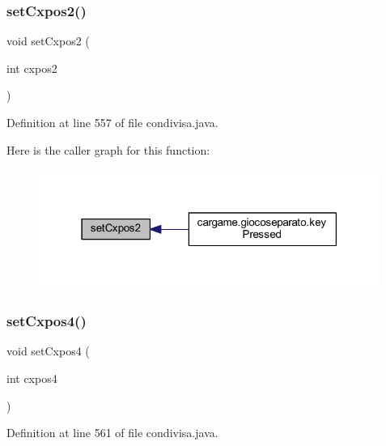 \subsubsection{\texorpdfstring{set\+Cxpos2()}{setCxpos2()}}
{\footnotesize\ttfamily void set\+Cxpos2 (\begin{DoxyParamCaption}\item[{int}]{cxpos2 }\end{DoxyParamCaption})}



Definition at line 557 of file condivisa.\+java.

Here is the caller graph for this function\+:
\nopagebreak
\begin{figure}[H]
\begin{center}
\leavevmode
\includegraphics[width=316pt]{classcargame_1_1condivisa_ace31301facdef5d53bd698061a4805ff_icgraph}
\end{center}
\end{figure}
\mbox{\label{classcargame_1_1condivisa_a63cb60098b1e4c023629879a0f46dd01}} 
\subsubsection{\texorpdfstring{set\+Cxpos4()}{setCxpos4()}}
{\footnotesize\ttfamily void set\+Cxpos4 (\begin{DoxyParamCaption}\item[{int}]{cxpos4 }\end{DoxyParamCaption})}



Definition at line 561 of file condivisa.\+java.

